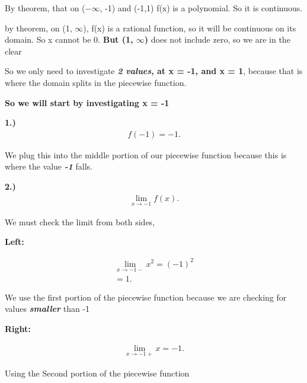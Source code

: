 \documentclass{report}
\begin{document}
        \bigbreak \noindent 
        By theorem, that on ($-\infty$, -1) and (-1,1) f(x) is a polynomial. So it is continuous.

        \bigbreak \noindent 
        by theorem, on (1, $\infty$), f(x) is a rational function, so it will be continuous on its domain.
        So x cannot be 0. \textbf{But (1, $\infty$)} does not include zero, so we are in the clear

        \bigbreak \noindent 
        So we only need to investigate \textbf{\textit{2 values}, at x = -1, and x = 1}, because
        that is where the domain splits in the piecewise function.

        \bigbreak \noindent 
        \textbf{So we will start by investigating x = -1}

        \bigbreak \noindent 
        \textbf{1.)}
        \begin{align*}
            f \left(-1\right) = -1
        .\end{align*}

        \bigbreak \noindent  
        We plug this into the middle portion of our piecewise function because this 
        is where the value \textbf{\textit{-1}} falls.

        \bigbreak \noindent 
        \textbf{2.)}
        \begin{align*}
            \lim\limits_{x \to -1}{f \left(x\right)}
        .\end{align*}

        \bigbreak \noindent 
        We must check the limit from both sides, 

        \bigbreak \noindent 
        \textbf{Left:}
        
        \begin{align*}
            \lim\limits_{x \to -1-}{x^2} = \left(-1\right)^2 \\ 
            = 1
        .\end{align*}

        \bigbreak \noindent 
        We use the first portion of the piecewise function because we are checking for values
        \textbf{\textit{smaller}} than -1

        \bigbreak \noindent 
        \textbf{Right:}

        \begin{align*}
            \lim\limits_{x \to -1+}{x} = -1
        .\end{align*}

        \bigbreak \noindent 
        Using the Second portion of the piecewise function
\end{document}
